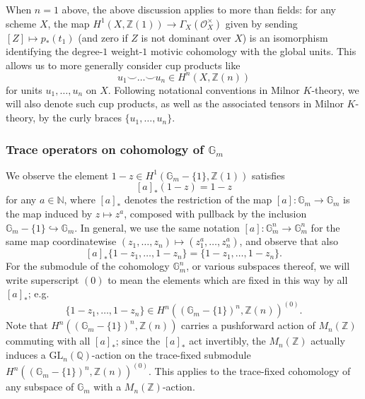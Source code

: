 \documentclass[10pt]{amsart}
\theoremstyle{definition}
\newcommand{\Z}{\mathbb{Z}}
\numberwithin{equation}{section}
\begin{document}
    When $n=1$ above, the above discussion applies to more than fields: for any scheme $X$, the map $H^1(X,\Z(1)) \to \Gamma_X(\mathcal{O}_X^\times)$
    given by sending $[Z]\mapsto p_*(t_1)$ (and zero if $Z$ is not dominant over $X$) is an isomorphism identifying the degree-$1$ weight-$1$ motivic cohomology with the global units. This allows us to more generally consider cup products like 
    \[
        u_1 \smile \ldots \smile u_n \in H^n(X, \Z(n))
    \]
    for units $u_1,\ldots, u_n$ on $X$. Following notational conventions in Milnor $K$-theory, we will also denote such cup products, as well as the associated tensors in Milnor $K$-theory, by the curly braces $\{u_1,\ldots, u_n\}$.

    \subsubsection{Trace operators on cohomology of $\mathbb{G}_m$}

    We observe the element $1-z\in H^1(\mathbb{G}_m-\{1\},\mathbb{Z}(1))$ satisfies 
    \[
    [a]_*(1-z) = 1-z
    \]
    for any $a\in \mathbb{N}$, where $[a]_*$ denotes the restriction of the map $[a]:\mathbb{G}_m\to \mathbb{G}_m$ is the map induced by $z\mapsto z^a$, composed with pullback by the inclusion $\mathbb{G}_m-\{1\} \hookrightarrow \mathbb{G}_m$. In general, we use the same notation $[a]:\mathbb{G}_m^n\to \mathbb{G}_m^n$ for the same map coordinatewise $(z_1,\ldots, z_n)\mapsto (z_1^a,\ldots, z_n^a)$, and observe that also 
    \[
    [a]_*\{1-z_1,\ldots, 1-z_n\} = \{1-z_1,\ldots, 1-z_n\}.
    \]
    For the submodule of the cohomology $\mathbb{G}_m^n$, or various subspaces thereof, we will write superscript $(0)$ to mean the elements which are fixed in this way by all $[a]_*$; e.g.
    \[
    \{1-z_1,\ldots, 1-z_n\} \in H^n((\mathbb{G}_m-\{1\})^n,\mathbb{Z}(n))^{(0)}.
    \]
    Note that $H^n((\mathbb{G}_m-\{1\})^n,\mathbb{Z}(n))$ carries a pushforward action of $M_n(\mathbb{Z})$ commuting with all $[a]_*$; since the $[a]_*$ act invertibly, the $M_n(\mathbb{Z})$ actually induces a $\mathrm{GL}_n(\mathbb{Q})$-action on the trace-fixed submodule $H^n((\mathbb{G}_m-\{1\})^n,\mathbb{Z}(n))^{(0)}$. This applies to the trace-fixed cohomology of any subspace of $\mathbb{G}_m$ with a $M_n(\mathbb{Z})$-action.
\end{document}
